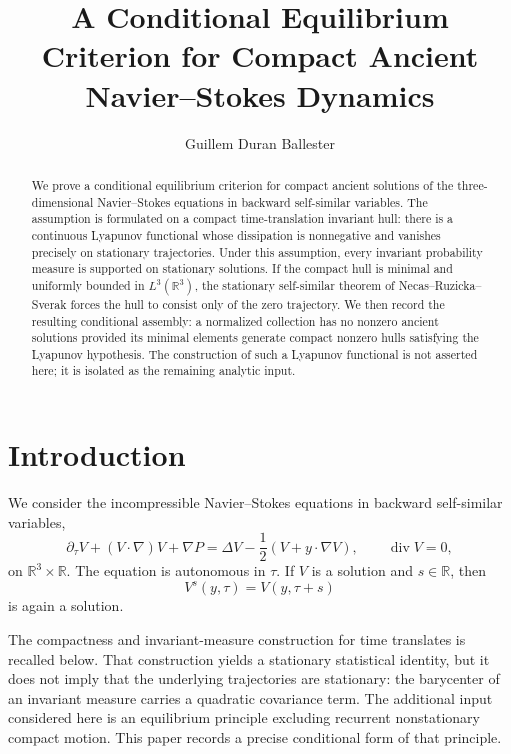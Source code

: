 \documentclass[11pt]{amsart}
\title[Conditional equilibrium criterion]{A Conditional Equilibrium Criterion for Compact Ancient Navier--Stokes Dynamics}
\author{Guillem Duran Ballester}
\date{}
\theoremstyle{plain}
\theoremstyle{definition}
\theoremstyle{remark}
\numberwithin{equation}{section}
\begin{document}
\begin{abstract}
We prove a conditional equilibrium criterion for compact ancient solutions of
the three-dimensional Navier--Stokes equations in backward self-similar
variables.  The assumption is formulated on a compact time-translation
invariant hull: there is a continuous Lyapunov functional whose dissipation is
nonnegative and vanishes precisely on stationary trajectories.  Under this
assumption, every invariant probability measure is supported on stationary
solutions.  If the compact hull is minimal and uniformly bounded in
\(L^3(\mathbb R^3)\), the stationary self-similar theorem of
Necas--Ruzicka--Sverak forces the hull to consist only of the zero trajectory.
We then record the resulting conditional assembly: a normalized collection has
no nonzero ancient solutions provided its minimal elements generate compact
nonzero hulls satisfying the Lyapunov hypothesis.  The construction of such a
Lyapunov functional is not asserted here; it is isolated as the remaining
analytic input.
\end{abstract}

\maketitle

\section{Introduction}

We consider the incompressible Navier--Stokes equations in backward
self-similar variables,
\begin{equation}\label{eq:centered}
   \partial_\tau V+(V\cdot\nabla)V+\nabla P
   =
   \Delta V-\frac12(V+y\cdot\nabla V),
   \qquad \operatorname{div}V=0,
\end{equation}
on \(\mathbb R^3\times\mathbb R\).  The equation is autonomous in
\(\tau\).  If \(V\) is a solution and \(s\in\mathbb R\), then
\[
   V^s(y,\tau)=V(y,\tau+s)
\]
is again a solution.

The compactness and invariant-measure construction for time translates is
recalled below.  That construction yields a stationary statistical identity,
but it does not imply that the underlying trajectories are stationary: the
barycenter of an invariant measure carries a quadratic covariance term.  The
additional input considered here is an equilibrium principle excluding
recurrent nonstationary compact motion.  This paper records a precise
conditional form of that principle.
\end{document}

